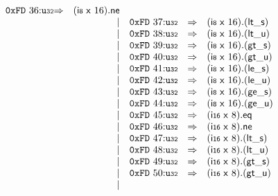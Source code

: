 $$\begin{array}{@{}l@{}rrlll@{}l@{}}
\mathtt{0xFD}~36{:}{\mathtt{u{\scriptstyle32}}} &\Rightarrow& (\mathsf{i{\scriptstyle8}}~\mathsf{x}~16) . \mathsf{ne} \\ &&|&
\mathtt{0xFD}~37{:}{\mathtt{u{\scriptstyle32}}} &\Rightarrow& (\mathsf{i{\scriptstyle8}}~\mathsf{x}~16) . ({\mathsf{lt\_}}{\mathsf{s}}) \\ &&|&
\mathtt{0xFD}~38{:}{\mathtt{u{\scriptstyle32}}} &\Rightarrow& (\mathsf{i{\scriptstyle8}}~\mathsf{x}~16) . ({\mathsf{lt\_}}{\mathsf{u}}) \\ &&|&
\mathtt{0xFD}~39{:}{\mathtt{u{\scriptstyle32}}} &\Rightarrow& (\mathsf{i{\scriptstyle8}}~\mathsf{x}~16) . ({\mathsf{gt\_}}{\mathsf{s}}) \\ &&|&
\mathtt{0xFD}~40{:}{\mathtt{u{\scriptstyle32}}} &\Rightarrow& (\mathsf{i{\scriptstyle8}}~\mathsf{x}~16) . ({\mathsf{gt\_}}{\mathsf{u}}) \\ &&|&
\mathtt{0xFD}~41{:}{\mathtt{u{\scriptstyle32}}} &\Rightarrow& (\mathsf{i{\scriptstyle8}}~\mathsf{x}~16) . ({\mathsf{le\_}}{\mathsf{s}}) \\ &&|&
\mathtt{0xFD}~42{:}{\mathtt{u{\scriptstyle32}}} &\Rightarrow& (\mathsf{i{\scriptstyle8}}~\mathsf{x}~16) . ({\mathsf{le\_}}{\mathsf{u}}) \\ &&|&
\mathtt{0xFD}~43{:}{\mathtt{u{\scriptstyle32}}} &\Rightarrow& (\mathsf{i{\scriptstyle8}}~\mathsf{x}~16) . ({\mathsf{ge\_}}{\mathsf{s}}) \\ &&|&
\mathtt{0xFD}~44{:}{\mathtt{u{\scriptstyle32}}} &\Rightarrow& (\mathsf{i{\scriptstyle8}}~\mathsf{x}~16) . ({\mathsf{ge\_}}{\mathsf{u}}) \\ &&|&
\mathtt{0xFD}~45{:}{\mathtt{u{\scriptstyle32}}} &\Rightarrow& (\mathsf{i{\scriptstyle16}}~\mathsf{x}~8) . \mathsf{eq} \\ &&|&
\mathtt{0xFD}~46{:}{\mathtt{u{\scriptstyle32}}} &\Rightarrow& (\mathsf{i{\scriptstyle16}}~\mathsf{x}~8) . \mathsf{ne} \\ &&|&
\mathtt{0xFD}~47{:}{\mathtt{u{\scriptstyle32}}} &\Rightarrow& (\mathsf{i{\scriptstyle16}}~\mathsf{x}~8) . ({\mathsf{lt\_}}{\mathsf{s}}) \\ &&|&
\mathtt{0xFD}~48{:}{\mathtt{u{\scriptstyle32}}} &\Rightarrow& (\mathsf{i{\scriptstyle16}}~\mathsf{x}~8) . ({\mathsf{lt\_}}{\mathsf{u}}) \\ &&|&
\mathtt{0xFD}~49{:}{\mathtt{u{\scriptstyle32}}} &\Rightarrow& (\mathsf{i{\scriptstyle16}}~\mathsf{x}~8) . ({\mathsf{gt\_}}{\mathsf{s}}) \\ &&|&
\mathtt{0xFD}~50{:}{\mathtt{u{\scriptstyle32}}} &\Rightarrow& (\mathsf{i{\scriptstyle16}}~\mathsf{x}~8) . ({\mathsf{gt\_}}{\mathsf{u}}) \\ &&|&

\end{array}$$
